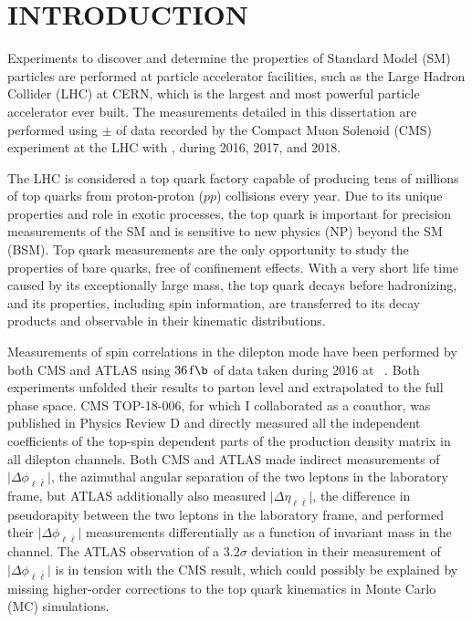 
\chapter*{INTRODUCTION}
\label{Introduction}
Experiments to discover and determine the properties of Standard Model (SM) particles are performed at particle accelerator facilities, such as the Large Hadron Collider (LHC) at CERN, which is the largest and most powerful particle accelerator ever built.
The measurements detailed in this dissertation are performed using \lumivalueRuniiUL $\pm$ \lumierrRuniiUL of data recorded by the Compact Muon Solenoid (CMS) experiment at the LHC with \beamenergy, during 2016, 2017, and 2018.

The LHC is considered a top quark factory capable of producing tens of millions of top quarks from proton-proton ($pp$) collisions every year.
Due to its unique properties and role in exotic processes, the top quark is important for precision measurements of the SM and is sensitive to new physics (NP) beyond the SM (BSM).
Top quark measurements are the only opportunity to study the properties of bare quarks, free of confinement effects.
With a very short life time caused by its exceptionally large mass, the top quark decays before hadronizing, and its properties, including spin information, are transferred to its decay products and observable in their kinematic distributions.

Measurements of \ttbar spin correlations in the dilepton mode have been performed by both CMS and ATLAS using $\SI{36}{\femto \b}$ of data taken during 2016 at \beamenergy~\cite{arxiv.1905.08634}\cite{Sirunyan:2681777}\cite{Aaboud:2667501}.
Both experiments unfolded their results to parton level and extrapolated to the full phase space.
CMS TOP-18-006, for which I collaborated as a coauthor, was published in Physics Review D and directly measured all the independent coefficients of the top-spin dependent parts of the \ttbar production density matrix in all dilepton channels.
Both CMS and ATLAS made indirect measurements of $\vert \Delta\phi_{\ell\bar{\ell}} \vert$, the azimuthal angular separation of the two leptons in the laboratory frame, but ATLAS additionally also measured $\vert \Delta\eta_{\ell\bar{\ell}} \vert$, the difference in pseudorapity between the two leptons in the laboratory frame, and performed their $\vert \Delta\phi_{\ell\bar{\ell}} \vert$ measurements differentially as a function of \ttbar invariant mass in the \emu channel.
The ATLAS observation of a $3.2 \sigma$ deviation in their measurement of $\vert \Delta\phi_{\ell\bar{\ell}} \vert$ is in tension with the CMS result, which could possibly be explained by missing higher-order corrections to the top quark kinematics in Monte Carlo (MC) simulations.

